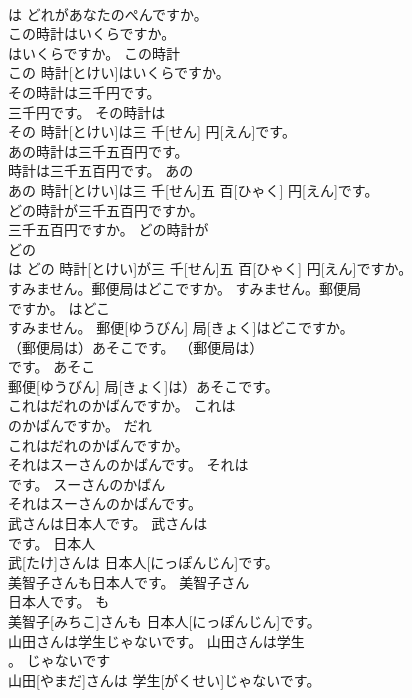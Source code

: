 \documentclass[8pt]{extreport}
\begin{document}
\begin{CJK}{UTF8}{min}
\\	は	どれがあなたのぺんですか。	
\\	この時計はいくらですか。	
\\	はいくらですか。	この時計	
\\	この 時計[とけい]はいくらですか。	
\\	その時計は三千円です。	
\\	三千円です。	その時計は	
\\	その 時計[とけい]は三 千[せん] 円[えん]です。	
\\	あの時計は三千五百円です。	
\\	時計は三千五百円です。	あの	
\\	あの 時計[とけい]は三 千[せん]五 百[ひゃく] 円[えん]です。	
\\	どの時計が三千五百円ですか。	
\\	三千五百円ですか。	どの時計が	
\\	どの 
\\	は	どの 時計[とけい]が三 千[せん]五 百[ひゃく] 円[えん]ですか。	
\\	すみません。郵便局はどこですか。	すみません。郵便局
\\	ですか。	はどこ	
\\	すみません。 郵便[ゆうびん] 局[きょく]はどこですか。	
\\	（郵便局は）あそこです。	（郵便局は）
\\	です。	あそこ	
\\	郵便[ゆうびん] 局[きょく]は）あそこです。	
\\	これはだれのかばんですか。	これは
\\	のかばんですか。	だれ	
\\	これはだれのかばんですか。	
\\	それはスーさんのかばんです。	それは
\\	です。	スーさんのかばん	
\\	それはスーさんのかばんです。	
\\	武さんは日本人です。	武さんは
\\	です。	日本人	
\\	武[たけ]さんは 日本人[にっぽんじん]です。	
\\	美智子さんも日本人です。	美智子さん
\\	日本人です。	も	
\\	美智子[みちこ]さんも 日本人[にっぽんじん]です。	
\\	山田さんは学生じゃないです。	山田さんは学生
\\	。	じゃないです	
\\	山田[やまだ]さんは 学生[がくせい]じゃないです。	

\end{CJK}
\end{document}
